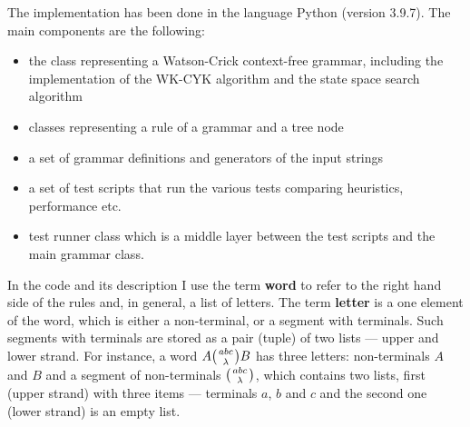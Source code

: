 The implementation has been done in the language Python (version 3.9.7). The main components are the following:
\begin{itemize}
  \item{the class representing a Watson-Crick context-free grammar, including the implementation of the WK-CYK algorithm and the state space search algorithm}
  \item{classes representing a rule of a grammar and a tree node}
  \item{a set of grammar definitions and generators of the input strings}
  \item{a set of test scripts that run the various tests comparing heuristics, performance etc.}
  \item{test runner class which is a middle layer between the test scripts and the main grammar class.}
\end{itemize}

In the code and its description I use the term \textbf{word} to refer to the right hand side of the rules and, in general, a list of letters. The term \textbf{letter} is a one element of the word, which is either a non-terminal, or a segment with terminals. Such segments with terminals are stored as a pair (tuple) of two lists --- upper and lower strand. For instance, a word
$A \wkpair{abc}{\lambda} B$
has three letters: non-terminals $A$ and $B$ and a segment of non-terminals $\wkpair{abc}{\lambda}$, which contains two lists, first (upper strand) with three items --- terminals $a$, $b$ and $c$ and the second one (lower strand) is an empty list.


